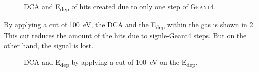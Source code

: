 \documentclass{article}
\begin{document}
\begin{figure}[h]
\centering
{}
\hfil
{}
\caption{DCA and E\textsubscript{dep} of hits created due to only one step of \textsc{Geant4}.}
\label{1hit_DCA_Edep}
\end{figure}

By applying a cut of 100~eV, the DCA and the E\textsubscript{dep} within the gas is shown in \cref{DCA_Edep_100eVcut}. This cut reduces the amount of the hits due to signle-Geant4 steps. But on the other hand, the signal is lost.

\begin{figure}[h]
\centering
{}
\hfil
{}
\caption{DCA and E\textsubscript{dep} by applying a cut of 100~eV on the E\textsubscript{dep}.}
\label{DCA_Edep_100eVcut}
\end{figure}
\end{document}
